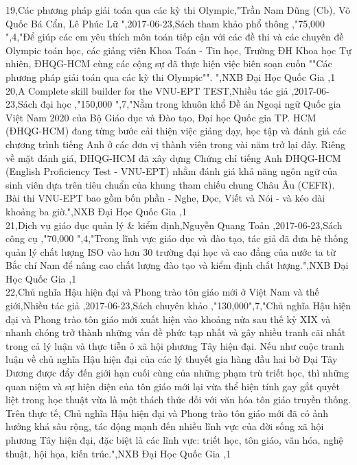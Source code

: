 \documentclass[a4paper]{article}
\begin{document}
19,Các phương pháp giải toán qua các kỳ thi Olympic,"Trần Nam Dũng (Cb), Võ Quốc Bá Cẩn, Lê Phúc Lữ ",2017-06-23,Sách tham khảo phổ thông ,"75,000 ",4,"Để giúp các em yêu thích môn toán tiếp cận với các đề thi và các chuyên đề Olympic toán học, các giảng viên Khoa Toán - Tin học, Trường ĐH Khoa học Tự nhiên, ĐHQG-HCM cùng các cộng sự đã thực hiện việc biên soạn cuốn ""Các phương pháp giải toán qua các kỳ thi Olympic"". ",NXB Đại Học Quốc Gia ,1\\
20,A Complete skill builder for the VNU-EPT TEST,Nhiều tác giả ,2017-06-23,Sách đại học ,"150,000 ",7,"Nằm trong khuôn khổ Đề án Ngoại ngữ Quốc gia Việt Nam 2020 của Bộ Giáo dục và Đào tạo, Đại học Quốc gia TP. HCM (ĐHQG-HCM) đang từng bước cải thiện việc giảng dạy, học tập và đánh giá các chương trình tiếng Anh ở các đơn vị thành viên trong vài năm trở lại đây. Riêng về mặt đánh giá, ĐHQG-HCM đã xây dựng Chứng chỉ tiếng Anh ĐHQG-HCM (English Proficiency Test - VNU-EPT) nhằm đánh giá khả năng ngôn ngữ của sinh viên dựa trên tiêu chuẩn của khung tham chiếu chung Châu Âu (CEFR). Bài thi VNU-EPT bao gồm bốn phần - Nghe, Đọc, Viết và Nói - và kéo dài khoảng ba giờ.",NXB Đại Học Quốc Gia ,1\\
21,Dịch vụ giáo dục quản lý \& kiểm định,Nguyễn Quang Toản ,2017-06-23,Sách công cụ ,"70,000 ",4,"Trong lĩnh vực giáo dục và đào tạo, tác giả đã đưa hệ thống quản lý chất lượng ISO vào hơn 30 trường đại học và cao đẳng của nước ta từ Bắc chí Nam để nâng cao chất lượng đào tạo và kiểm định chất lượng.",NXB Đại Học Quốc Gia ,1\\
22,Chủ nghĩa Hậu hiện đại và Phong trào tôn giáo mới ở Việt Nam và thế giới,Nhiều tác giả ,2017-06-23,Sách chuyên khảo ,"130,000",7,"Chủ nghĩa Hậu hiện đại và Phong trào tôn giáo mới xuất hiện vào khoảng nửa sau thế kỷ XIX và nhanh chóng trở thành những vấn đề phức tạp nhất và gây nhiều tranh cãi nhất trong cả lý luận và thực tiễn ỏ xã hội phương Tây hiện đại. Nếu như cuộc tranh luận về chủ nghĩa Hậu hiện đại của các lý thuyết gia hàng đầu hai bờ Đại Tây Dương được đẩy đến giới hạn cuối cùng của những phạm trù triết học, thì những quan niệm và sự hiện diện của tôn giáo mới lại vừa thể hiện tính gay gắt quyết liệt trong học thuật vừa là một thách thức đối với văn hóa tôn giáo truyền thống. Trên thực tế, Chủ nghĩa Hậu hiện đại và Phong trào tôn giáo mới đã có ảnh hưởng khá sâu rộng, tác động mạnh đến nhiều lĩnh vực của đời sống xã hội phương Tây hiện đại, đặc biệt là các lĩnh vực: triết học, tôn giáo, văn hóa, nghệ thuật, hội họa, kiến trúc.",NXB Đại Học Quốc Gia ,1\\
\end{document}

